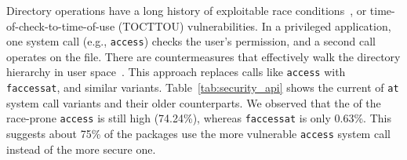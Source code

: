 Directory operations have a long history of exploitable race conditions~\citep{tocttou-truck, wei05fast, races-usenix05}, or time-of-check-to-time-of-use (TOCTTOU) vulnerabilities.
In a privileged application, one system call (e.g., {\tt access}) checks 
the user's permission, and a second call operates on the file.
There are countermeasures that effectively walk the directory
hierarchy in user space~\citep{tsafrir08tr}.
This approach replaces calls like {\tt access} with {\tt faccessat},
and similar variants.
Table~\ref{tab:security_api} shows the current \unwusagemetric{} of
{\tt *at} system call variants and their older counterparts.
We observed that the \unwusagemetric{} of
the race-prone {\tt access} is still high (74.24\%), whereas {\tt faccessat} is only 0.63\%.
This suggests about 75\% of the
packages use the more vulnerable {\tt access} system call instead of the more secure one.

